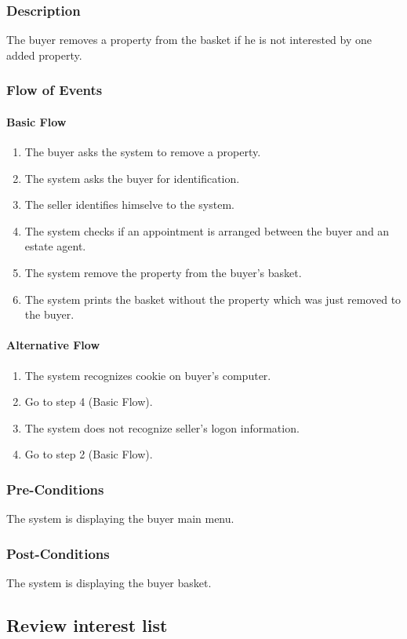 \documentclass[a4paper,12pt]{article}
\begin{document}
\subsubsection{Description}
The buyer removes a property from the basket if he is not interested by one added property.
\subsubsection{Flow of Events}
\paragraph{Basic Flow}
\begin{enumerate}
\item The buyer asks the system to remove a property.
\item The system asks the buyer for identification.
\item The seller identifies himselve to the system.
\item The system checks if an appointment is arranged between the buyer and an estate agent.
\item The system remove the property from the buyer's basket.
\item The system prints the basket without the property which was just removed to the buyer.
\end{enumerate}
\paragraph{Alternative Flow}
\begin{enumerate}
\item The system recognizes cookie on buyer's computer. 
\item Go to step 4 (Basic Flow).
\item The system does not recognize seller's logon information.
\item Go to step 2 (Basic Flow).
\end{enumerate}
\subsubsection{Pre-Conditions}
The system is displaying the buyer main menu.
\subsubsection{Post-Conditions}
The system is displaying the buyer basket.

\subsection{Review interest list}
\end{document}
